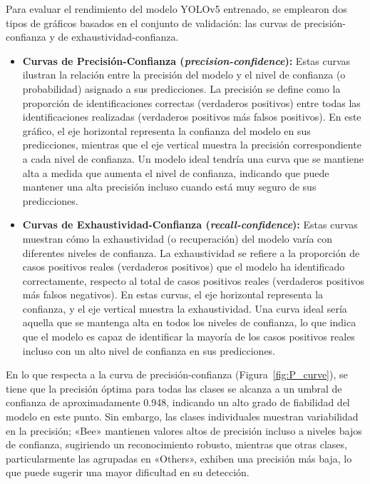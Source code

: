 Para evaluar el rendimiento del modelo YOLOv5 entrenado, se emplearon dos tipos de gráficos basados en el conjunto de validación: las curvas de precisión-confianza y de exhaustividad-confianza.

\begin{itemize}
    \item 
    \textbf{Curvas de Precisión-Confianza (\textit{precision-confidence}):} Estas curvas ilustran la relación entre la precisión del modelo y el nivel de confianza (o probabilidad) asignado a sus predicciones. La precisión se define como la proporción de identificaciones correctas (verdaderos positivos) entre todas las identificaciones realizadas (verdaderos positivos más falsos positivos). En este gráfico, el eje horizontal representa la confianza del modelo en sus predicciones, mientras que el eje vertical muestra la precisión correspondiente a cada nivel de confianza. Un modelo ideal tendría una curva que se mantiene alta a medida que aumenta el nivel de confianza, indicando que puede mantener una alta precisión incluso cuando está muy seguro de sus predicciones.
    \item 
    \textbf{Curvas de Exhaustividad-Confianza (\textit{recall-confidence}):} Estas curvas muestran cómo la exhaustividad (o recuperación) del modelo varía con diferentes niveles de confianza. La exhaustividad se refiere a la proporción de casos positivos reales (verdaderos positivos) que el modelo ha identificado correctamente, respecto al total de casos positivos reales (verdaderos positivos más falsos negativos). En estas curvas, el eje horizontal representa la confianza, y el eje vertical muestra la exhaustividad. Una curva ideal sería aquella que se mantenga alta en todos los niveles de confianza, lo que indica que el modelo es capaz de identificar la mayoría de los casos positivos reales incluso con un alto nivel de confianza en sus predicciones.
\end{itemize}
    
En lo que respecta a la curva de precisión-confianza (Figura~\ref{fig:P_curve}), se tiene que la precisión óptima para todas las clases se alcanza a un umbral de confianza de aproximadamente 0.948, indicando un alto grado de fiabilidad del modelo en este punto. Sin embargo, las clases individuales muestran variabilidad en la precisión; «Bee» mantienen valores altos de precisión incluso a niveles bajos de confianza, sugiriendo un reconocimiento robusto, mientras que otras clases, particularmente las agrupadas en «Others», exhiben una precisión más baja, lo que puede sugerir una mayor dificultad en su detección.

